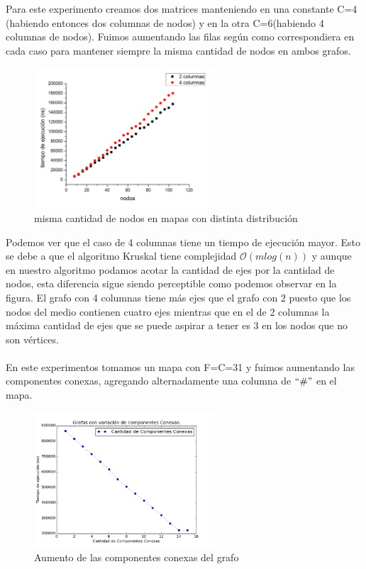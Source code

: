 \documentclass[spanish,12pt]{article}
\begin{document}
Para este experimento creamos dos matrices manteniendo en una constante C=4 (habiendo entonces dos columnas de nodos) y en la otra C=6(habiendo 4 columnas de nodos). Fuimos aumentando las filas según como correspondiera en cada caso para mantener siempre la misma cantidad de nodos en ambos grafos.
\begin{figure}[H]
\centering
\includegraphics[width=0.6\textwidth]{2columvs4colum}
\caption{misma cantidad de nodos en mapas con distinta distribución}
\end{figure}

Podemos ver que el caso de 4 columnas tiene un tiempo de ejecución mayor. Esto se debe a que el algoritmo Kruskal tiene complejidad $\mathcal{O}(mlog(n))$ y aunque en nuestro algoritmo podamos acotar la cantidad de ejes por la cantidad de nodos, esta diferencia sigue siendo perceptible como podemos observar en la figura. El grafo con 4 columnas tiene más ejes que el grafo con 2 puesto que los nodos del medio contienen cuatro ejes mientras que en el de 2 columnas la máxima cantidad de ejes que se puede aspirar a tener es 3 en los nodos que no son vértices.
\\
\\

En este experimentos tomamos un mapa con F=C=31 y fuimos aumentando las componentes  conexas, agregando alternadamente una columna de $``\#"$ en el mapa.
\begin{figure}[H]
\centering
\includegraphics[width=0.6\textwidth]{CompConexas}
\caption{Aumento de las componentes conexas del grafo}
\end{figure}
\end{document}
